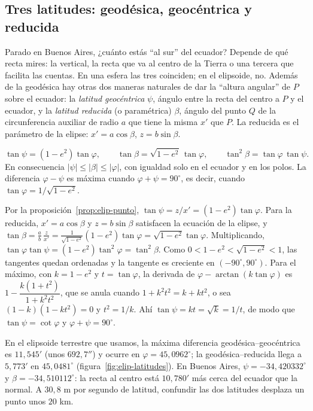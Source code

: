 \subsection{Tres latitudes: geodésica, geocéntrica y reducida}\label{sec:latitudes}

Parado en Buenos Aires, ¿cuánto estás \enquote{al sur} del ecuador? Depende de qué recta mires:
la vertical, la recta que va al centro de la Tierra o una tercera que facilita las cuentas.
En una esfera las tres coinciden; en el elipsoide, no.
Además de la geodésica hay otras dos maneras naturales de dar la \enquote{altura angular} de
\(P\) sobre el ecuador: la \emph{latitud geocéntrica} \(\psi\), ángulo entre la recta del
centro a \(P\) y el ecuador, y la \emph{latitud reducida} (o paramétrica) \(\beta\), ángulo del
punto \(Q\) de la circunferencia auxiliar de radio \(a\) que tiene la misma \(x'\) que \(P\).
La reducida es el parámetro de la elipse: \(x'=a\cos\beta\), \(z=b\sin\beta\).

\begin{proposicion}\label{prop:elip-latitudes}
\[
  \tan\psi=(1-e^2)\tan\varphi,\qquad
  \tan\beta=\sqrt{1-e^2}\,\tan\varphi,\qquad
  \tan^2\beta=\tan\varphi\,\tan\psi .
\]
En consecuencia \(|\psi|\le|\beta|\le|\varphi|\), con igualdad solo en el ecuador y en los
polos. La diferencia \(\varphi-\psi\) es máxima cuando \(\varphi+\psi=90^\circ\), es decir,
cuando \(\tan\varphi=1/\sqrt{1-e^2}\).
\end{proposicion}

\begin{demostracion}
Por la proposición~\ref{prop:elip-punto}, \(\tan\psi=z/x'=(1-e^2)\tan\varphi\). Para la
reducida, \(x'=a\cos\beta\) y \(z=b\sin\beta\) satisfacen la ecuación de la elipse, y
\(\tan\beta=\frac ab\,\frac z{x'}=\frac1{\sqrt{1-e^2}}(1-e^2)\tan\varphi=\sqrt{1-e^2}\tan\varphi\).
Multiplicando, \(\tan\varphi\tan\psi=(1-e^2)\tan^2\varphi=\tan^2\beta\). Como
\(0<1-e^2<\sqrt{1-e^2}<1\), las tangentes quedan ordenadas y la tangente es creciente en
\((-90^\circ,90^\circ)\). Para el máximo, con \(k=1-e^2\) y \(t=\tan\varphi\), la derivada de
\(\varphi-\arctan(k\tan\varphi)\) es \(1-\dfrac{k(1+t^2)}{1+k^2t^2}\), que se anula cuando
\(1+k^2t^2=k+kt^2\), o sea \((1-k)(1-kt^2)=0\) y \(t^2=1/k\). Ahí
\(\tan\psi=kt=\sqrt k=1/t\), de modo que \(\tan\psi=\cot\varphi\) y \(\varphi+\psi=90^\circ\).
\end{demostracion}

En el elipsoide terrestre que usamos, la máxima diferencia geodésica--geocéntrica es \(11{,}545'\) (unos \(692{,}7''\)) y
ocurre en \(\varphi=45{,}0962^\circ\); la geodésica--reducida llega a \(5{,}773'\) en
\(45{,}0481^\circ\) (figura~\ref{fig:elip-latitudes}). En Buenos Aires,
\(\psi=-34{,}420332^\circ\) y \(\beta=-34{,}510112^\circ\): la recta al centro está
\(10{,}780'\) más cerca del ecuador que la normal. A \(30{,}8\) m por segundo de latitud,
confundir las dos latitudes desplaza un punto unos \(20\) km.

